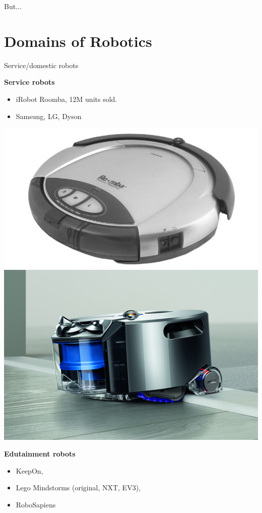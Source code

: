 \documentclass[compress]{beamer}
\begin{document}
\begin{frame}[plain]{}
    But...
\end{frame}



\section{Domains of Robotics}

\begin{frame}{Service/domestic robots}


    \begin{multicols}{2}

        \textbf{Service robots}

        \begin{itemize}
            \item
                iRobot Roomba, 12M units sold.
            \item
                Samsung, LG, Dyson
        \end{itemize}
        \vfill
        \columnbreak

        \begin{center}
            \includegraphics[width=0.5\linewidth]{roomba}
            \includegraphics[width=0.5\linewidth]{dyson}
        \end{center}
    \end{multicols}


    \begin{multicols}{2}


        \textbf{Edutainment robots}

        \begin{itemize}
            \item \eg KeepOn, 
            \item Lego Mindstorms (original, NXT, EV3),
            \item RoboSapiens
        \end{itemize}
        \vfill
        \columnbreak
        \begin{center}


\end{center}
\end{multicols}
\end{frame}
\end{document}
